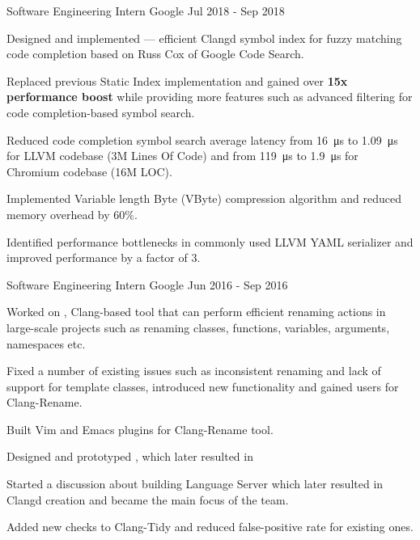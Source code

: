 \begin{cventries}
  \cventry
    {Software Engineering Intern}
    {Google}
    {}
    {Jul 2018 - Sep 2018}
    {
      \begin{cvitems}
        \item Designed and implemented
          --- efficient Clangd symbol index for fuzzy matching code completion
          based on Russ Cox
           of Google Code
          Search.
        \item Replaced previous Static Index implementation and gained over
          \textbf{15x performance boost} while providing more features such as
          advanced filtering for code completion-based symbol search.
        \item Reduced code completion symbol search average latency from
          \SI{16}{\us} to \SI{1.09}{\us} for LLVM codebase (3M Lines Of Code)
          and from \SI{119}{\us} to \SI{1.9}{\us} for Chromium codebase (16M
          LOC).
        \item Implemented Variable length Byte (VByte) compression algorithm
          and reduced memory overhead by 60\%.
        \item Identified performance bottlenecks in commonly used LLVM YAML
          serializer and improved performance by a factor of 3.
      \end{cvitems}
    }

  \cventry
    {Software Engineering Intern}
    {Google}
    {}
    {Jun 2016 - Sep 2016}
    {
      \begin{cvitems}
        \item Worked on
        ,
          Clang-based tool that can perform efficient renaming actions in
          large-scale projects such as renaming classes, functions,
          variables, arguments, namespaces etc.
        \item Fixed a number of existing issues such as inconsistent renaming
          and lack of support for template classes, introduced new
          functionality and gained users for Clang-Rename.
        \item Built Vim and Emacs plugins for Clang-Rename tool.
        \item Designed and prototyped
          ,
          which later resulted in
        \item Started a discussion about building Language Server which later
          resulted in Clangd creation and became the main focus of the team.
        \item Added new checks to Clang-Tidy and reduced false-positive rate
        for existing ones.
      \end{cvitems}
    }


\end{cventries}
